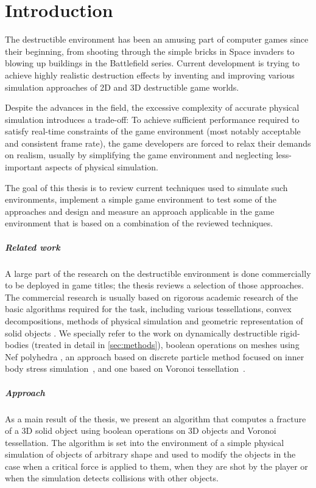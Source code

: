 \chapter*{Introduction}
The destructible environment has been an amusing part of computer games since their beginning, from shooting through the simple bricks in Space invaders to blowing up buildings in the Battlefield series. Current development is trying to achieve highly realistic destruction effects by inventing and improving various simulation approaches of 2D and 3D destructible game worlds.

Despite the advances in the field, the excessive complexity of accurate physical simulation introduces a trade-off: To achieve sufficient performance required to satisfy real-time constraints of the game environment (most notably acceptable and consistent frame rate), the game developers are forced to relax their demands on realism, usually by simplifying the game environment and neglecting less-important aspects of physical simulation.

The goal of this thesis is to review current techniques used to simulate such environments, implement a simple game environment to test some of the approaches and design and measure an approach applicable in the game environment that is based on a combination of the reviewed techniques.

\paragraph{Related work}
A large part of the research on the destructible environment is done commercially to be deployed in game titles; the thesis reviews a selection of those approaches. The commercial research is usually based on rigorous academic research of the basic algorithms required for the task, including various tessellations, convex decompositions, methods of physical simulation and geometric representation of solid objects . We specially refer to the work on dynamically destructible rigid-bodies (treated in detail in \cref{sec:methods}), boolean operations on meshes using Nef polyhedra \citet{nefpoly}, an approach based on discrete particle method focused on inner body stress simulation~\cite{edem}, and one based on Voronoi tessellation~\cite{nvidia}.

\paragraph{Approach}
As a main result of the thesis, we present an algorithm that computes a fracture of a 3D solid object using boolean operations on 3D objects and Voronoi tessellation. The algorithm is set into the environment of a simple physical simulation of objects of arbitrary shape and used to modify the objects in the case when a critical force is applied to them, \ie when they are shot by the player or when the simulation detects collisions with other objects.

